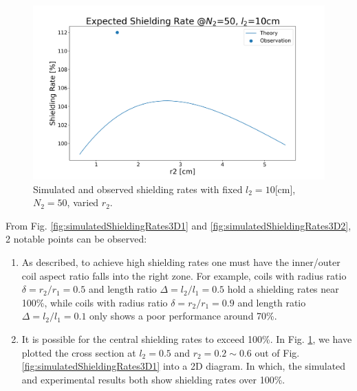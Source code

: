 \begin{figure}[H]
  \includegraphics[width=17cm, bb=9 9 900 500]{./section3Effectiveness/simulatedShieldingRates2.png}
  \caption{Simulated and observed shielding rates with fixed $l_2 = 10$[cm], $N_2 = 50$, varied $r_2$.}
  \label{fig:overshielding}
\end{figure}

From Fig. \ref{fig:simulatedShieldingRates3D1} and \ref{fig:simulatedShieldingRates3D2},
2 notable points can be observed:
\begin{enumerate}
  \item As described, to achieve high shielding rates one must have the inner/outer coil aspect ratio falls into the right zone.
  For example, coils with radius ratio $\delta = r_2/r_1 = 0.5$ and length ratio $\Delta = l_2/l_1 = 0.5$ hold a shielding rates near 100\%,
  while coils with radius ratio $\delta = r_2/r_1 = 0.9$ and length ratio $\Delta = l_2/l_1 = 0.1$ only shows a poor performance around 70\%.
  \item It is possible for the central shielding rates to exceed 100\%.
  In Fig. \ref{fig:overshielding}, we have plotted the cross section at $l_2 = 0.5$ and $r_2 = 0.2\sim0.6$ out of Fig. \ref{fig:simulatedShieldingRates3D1} into a 2D diagram.
  In which, the simulated and experimental results both show shielding rates over 100\%.
\end{enumerate}

